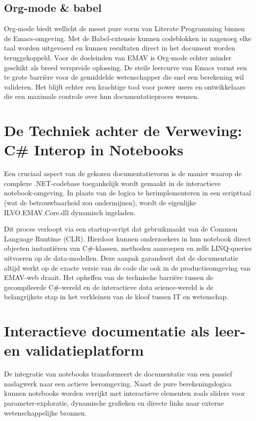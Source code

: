 \subsection{Org-mode \& babel}
Org-mode \autocite{orgmode2025} biedt wellicht de meest pure vorm van Literate Programming binnen de Emacs-omgeving. Met de Babel-extensie kunnen codeblokken in nagenoeg elke taal worden uitgevoerd en kunnen resultaten direct in het document worden teruggekoppeld. Voor de doeleinden van EMAV is Org-mode echter minder geschikt als breed verspreide oplossing. De steile leercurve van Emacs vormt een te grote barrière voor de gemiddelde wetenschapper die snel een berekening wil valideren. Het blijft echter een krachtige tool voor power users en ontwikkelaars die een maximale controle over hun documentatieproces wensen.

\section{De Techniek achter de Verweving: C\# Interop in Notebooks}
Een cruciaal aspect van de gekozen documentatievorm is de manier waarop de complexe .NET-codebase toegankelijk wordt gemaakt in de interactieve notebook-omgeving. In plaats van de logica te herimplementeren in een scripttaal (wat de betrouwbaarheid zou ondermijnen), wordt de eigenlijke ILVO.EMAV.Core.dll dynamisch ingeladen.

Dit proces verloopt via een startup-script dat gebruikmaakt van de Common Language Runtime (CLR). Hierdoor kunnen onderzoekers in hun notebook direct objecten instanti\"eren van C\#-klassen, methoden aanroepen en zelfs LINQ-queries uitvoeren op de data-modellen. Deze aanpak garandeert dat de documentatie altijd werkt op de exacte versie van de code die ook in de productieomgeving van EMAV-web draait. Het opheffen van de technische barri\"ere tussen de gecompileerde C\#-wereld en de interactieve data science-wereld is de belangrijkste stap in het verkleinen van de kloof tussen IT en wetenschap.

\section{Interactieve documentatie als leer- en validatieplatform}
{\sloppy De integratie van notebooks transformeert de documentatie van een passief naslagwerk naar een actieve leeromgeving. Naast de pure berekeningslogica kunnen notebooks worden verrijkt met interactieve elementen zoals sliders voor parameter-exploratie, dynamische grafieken en directe links naar externe wetenschappelijke bronnen.\par}

